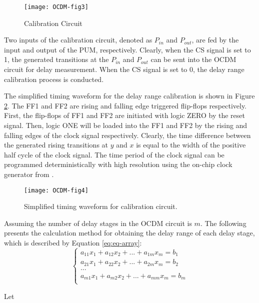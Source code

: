 \begin{figure}[t]
\centering
\texttt{[image: OCDM-fig3]}
   \caption{Calibration Circuit}
    \label{fig:OCDM-fig3}
\end{figure}


Two inputs of the calibration circuit, denoted as $P_{in}$ and $P_{out}$, are fed by the input and output of the PUM, respectively. Clearly, when the CS signal is set to 1, the generated transitions at the $P_{in}$ and $P_{out}$ can be sent into the OCDM circuit for delay measurement. When the CS signal is set to 0, the delay range calibration process is conducted.

The simplified timing waveform for the delay range calibration is shown in Figure \ref{fig:OCDM-fig4}. The FF1 and FF2 are rising and falling edge triggered flip-flops respectively. First, the flip-flops of FF1 and FF2 are initiated with logic ZERO by the reset signal. Then, logic ONE will be loaded into the FF1 and FF2 by the rising and falling edges of the clock signal respectively. Clearly, the time difference between the generated rising transitions at $y$ and $x$ is equal to the width of the positive half cycle of the clock signal. The time period of the clock signal can be programmed deterministically with high resolution using the on-chip clock generator from \cite{kaeriyama20071}.

\begin{figure}[t]
\centering
\texttt{[image: OCDM-fig4]}
   \caption{Simplified timing waveform for calibration circuit.}
    \label{fig:OCDM-fig4}
\end{figure}


Assuming the number of delay stages in the OCDM circuit is $m$. The following presents the calculation method for obtaining the delay range of each delay stage, which is described by Equation \ref{eq:eq-array}:
\begin{equation} \label{eq:eq-array}
    \begin{cases}
        a_{11}x_{1} + a_{12}x_{2} + ... +a_{1m}x_{m}=b_{1} \\
        a_{21}x_{1} + a_{22}x_{2} + ... +a_{2m}x_{m}=b_{2} \\
        ... \\
        a_{m1}x_{1} + a_{m2}x_{2} + ... +a_{mm}x_{m}=b_{m} \\
    \end{cases}
\end{equation}

Let

